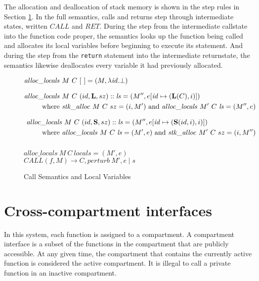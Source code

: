 \documentclass{article}
\begin{document}
The allocation and deallocation of stack memory is shown in the step rules in
Section \ref{fig:callret}. In the full semantics, calls and returns step through
intermediate states, written \(\mathit{CALL}\) and \(\mathit{RET}\). During the
step from the intermediate callstate into the function code proper, the semantics
looks up the function being called and allocates its local variables before beginning
to execute its statement. And during the step from the {\tt return} statement into
the intermediate returnstate, the semantics likewise deallocates every variable it had
previously allocated.

\begin{figure}

  \[\begin{split}
  \mathit{alloc\_locals} ~ & M ~ C ~ [~] = (M, \lambda \mathit{id} . \bot) \\[0.75em]
  \mathit{alloc\_locals} ~ & M ~ C ~ (id,\mathbf{L},sz)::\mathit{ls} =
  (M'', e[\mathit{id} \mapsto (\mathbf{L}(C),i)]) \\
  \textnormal{where } & \mathit{stk\_alloc} ~ M ~ C ~ sz = (i, M')
  \textnormal{ and } \mathit{alloc\_locals} ~ M' ~ C ~ \mathit{ls} = (M'', e) \\[0.75em]
  \mathit{alloc\_locals} & ~ M ~ C ~ (id,\mathbf{S},sz)::\mathit{ls} =
  (M'', e[\mathit{id} \mapsto (\mathbf{S}(id,i),i)]) \\
  \textnormal{where } & \mathit{alloc\_locals} ~ M ~ C ~ \mathit{ls} = (M', e)
  \textnormal{ and } \mathit{stk\_alloc} ~ M' ~ C ~ sz = (i, M'') \\[0.75em]
  \end{split}\]
      
              {\(\mathit{alloc\_locals} ~ M ~ C ~ \mathit{locals} = (M',e)\)}
              {\(\mathit{CALL}(f,M) \longrightarrow
                C,\mathit{perturb} ~ M',e \mid s\)}
  \caption{Call Semantics and Local Variables}
  \label{fig:callret}

\end{figure}

\section{Cross-compartment interfaces}
\label{sec:interfaces}

In this system, each function is assigned to a compartment. A compartment interface
is a subset of the functions in the compartment that are publicly accessible.
At any given time, the compartment that contains the currently active function is
considered the active compartment. It is illegal to call a private function in an
inactive compartment.
\end{document}
